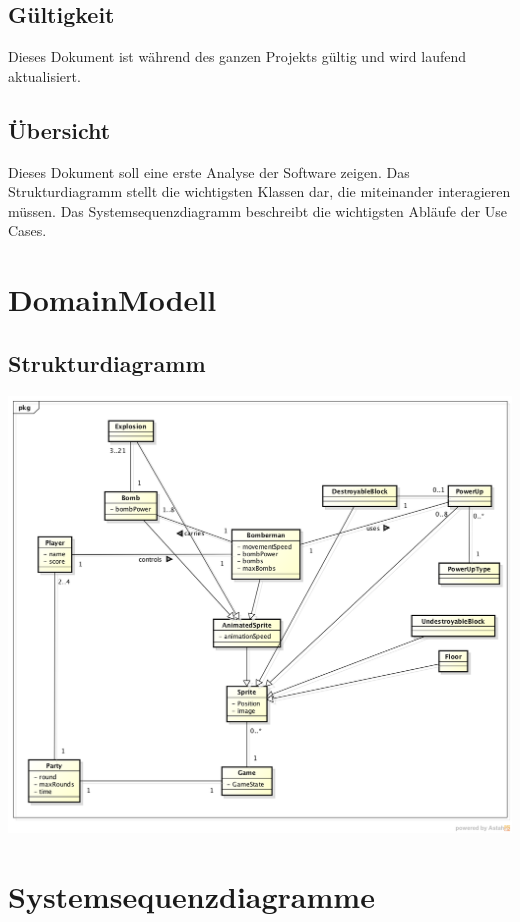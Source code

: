 \documentclass[11pt]{scrartcl}
\begin{document}
\subsection{Gültigkeit}
\label{sec:Gültigkeit}
Dieses Dokument ist während des ganzen Projekts gültig und wird laufend aktualisiert.

\subsection{Übersicht}
\label{sec:Übersicht}
Dieses Dokument soll eine erste Analyse der Software zeigen. Das Strukturdiagramm stellt die wichtigsten Klassen dar, die miteinander interagieren müssen. Das Systemsequenzdiagramm beschreibt die wichtigsten Abläufe der Use Cases.

\newpage
\section{DomainModell}
\label{sec:DomainModell}
\subsection{Strukturdiagramm}
\label{sec:Strukturdiagramm}

\begin{center}
\includegraphics[scale=0.5]{Strukturdiagramm_JBomberman} 
\end{center}

\newpage
\section{Systemsequenzdiagramme}
\label{sec:Systemsequenzdiagramme}
\end{document}

